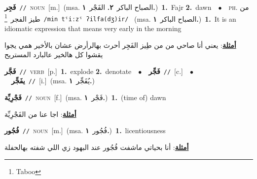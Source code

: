\documentclass[10pt,a4paper,twoside]{article} %
\begin{document}
\begin{multicols}{2}
{\setlength\topsep{0pt}\textbf{\foreignlanguage{arabic}{فَجِر}}\ {\color{gray}\texttt{//}\color{black}}\ \textsc{noun}\ [m.]\ \color{gray}(msa. \foreignlanguage{arabic}{الصباح الباكر}~\foreignlanguage{arabic}{\textbf{٢.}}  \foreignlanguage{arabic}{الفَجْر}~\foreignlanguage{arabic}{\textbf{١.}})\color{black}\ \textbf{1.}~Fajr  \textbf{2.}~dawn\ \ $\bullet$\ \ \textsc{ph.} \color{gray} \foreignlanguage{arabic}{من طيز الفجر}\color{black}\ \footnote{Taboo}\ {\color{gray}\texttt{/{\sffamily min tˤiːzˤ ʔilfa(dʒ)ir}/}\color{black}}\ \color{gray} (msa. \foreignlanguage{arabic}{الصباح الباكر}~\foreignlanguage{arabic}{\textbf{١.}})\color{black}\ \textbf{1.}~It is an idiomatic expression that means very early in the morning\  \begin{flushright}\color{gray}\foreignlanguage{arabic}{\textbf{\underline{\foreignlanguage{arabic}{أمثلة}}}: يعني أنا صاحي من من طِيز الفَجِر أحرث بهالرأرض عشان بالأخير همي يجوا يقشوا كل هالخير عالبارد المستريح}\end{flushright}\color{black}} \vspace{2mm}

{\setlength\topsep{0pt}\textbf{\foreignlanguage{arabic}{فَجَّر}}\ {\color{gray}\texttt{//}\color{black}}\ \textsc{verb}\ [p.]\ \textbf{1.}~explode  \textbf{2.}~denotate\ \ $\bullet$\ \ \setlength\topsep{0pt}\textbf{\foreignlanguage{arabic}{فَجِّر}}\ {\color{gray}\texttt{//}\color{black}}\ [c.]\ \ $\bullet$\ \ \setlength\topsep{0pt}\textbf{\foreignlanguage{arabic}{يفَجِّر}}\ {\color{gray}\texttt{//}\color{black}}\ [i.]\ \color{gray}(msa. \foreignlanguage{arabic}{يُفَجِّر}~\foreignlanguage{arabic}{\textbf{١.}})\color{black}\ } \vspace{2mm}

{\setlength\topsep{0pt}\textbf{\foreignlanguage{arabic}{فَجْرِيِّة}}\ {\color{gray}\texttt{//}\color{black}}\ \textsc{noun}\ [f.]\ \color{gray}(msa. \foreignlanguage{arabic}{فَجْر}~\foreignlanguage{arabic}{\textbf{١.}})\color{black}\ \textbf{1.}~(time of) dawn\  \begin{flushright}\color{gray}\foreignlanguage{arabic}{\textbf{\underline{\foreignlanguage{arabic}{أمثلة}}}: اجا عنا من الفَجْرِيِّة}\end{flushright}\color{black}} \vspace{2mm}

{\setlength\topsep{0pt}\textbf{\foreignlanguage{arabic}{فُجُور}}\ {\color{gray}\texttt{//}\color{black}}\ \textsc{noun}\ [m.]\ \color{gray}(msa. \foreignlanguage{arabic}{فُجُور}~\foreignlanguage{arabic}{\textbf{١.}})\color{black}\ \textbf{1.}~licentiousness\  \begin{flushright}\color{gray}\foreignlanguage{arabic}{\textbf{\underline{\foreignlanguage{arabic}{أمثلة}}}: أنا بحياتي ماشفت فُجُور عند البهود زي اللي شفته بهالحفلة}\end{flushright}\color{black}} \vspace{2mm}


\end{multicols}
\end{document}
